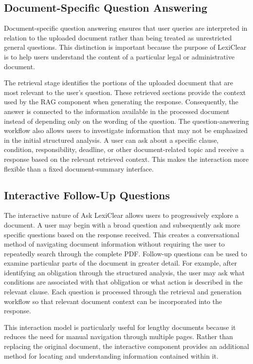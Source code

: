 \documentclass[12pt,a4paper,oneside]{report}
\begin{document}
\subsection{Document-Specific Question Answering}

Document-specific question answering ensures that user queries are interpreted in relation to the uploaded document rather than being treated as unrestricted general questions. This distinction is important because the purpose of LexiClear is to help users understand the content of a particular legal or administrative document.

The retrieval stage identifies the portions of the uploaded document that are most relevant to the user's question. These retrieved sections provide the context used by the RAG component when generating the response. Consequently, the answer is connected to the information available in the processed document instead of depending only on the wording of the question. The question-answering workflow also allows users to investigate information that may not be emphasized in the initial structured analysis. A user can ask about a specific clause, condition, responsibility, deadline, or other document-related topic and receive a response based on the relevant retrieved context. This makes the interaction more flexible than a fixed document-summary interface.

\subsection{Interactive Follow-Up Questions}

The interactive nature of Ask LexiClear allows users to progressively explore a document. A user may begin with a broad question and subsequently ask more specific questions based on the response received. This creates a conversational method of navigating document information without requiring the user to repeatedly search through the complete PDF. Follow-up questions can be used to examine particular parts of the document in greater detail. For example, after identifying an obligation through the structured analysis, the user may ask what conditions are associated with that obligation or what action is described in the relevant clause. Each question is processed through the retrieval and generation workflow so that relevant document context can be incorporated into the response.

This interaction model is particularly useful for lengthy documents because it reduces the need for manual navigation through multiple pages. Rather than replacing the original document, the interactive component provides an additional method for locating and understanding information contained within it.
\end{document}

